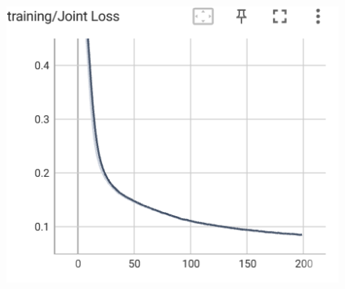 \documentclass[12pt]{article}
\begin{document}
\begin{enumerate}
\begin{figure}[htbp]
\begin{minipage}{0.4\linewidth}
		\includegraphics[width=0.9\linewidth]{./figs/joint_loss_50_50.png}
		\label{pic three}%
	\end{minipage}
    \end{figure}


\end{enumerate}
\end{document}
